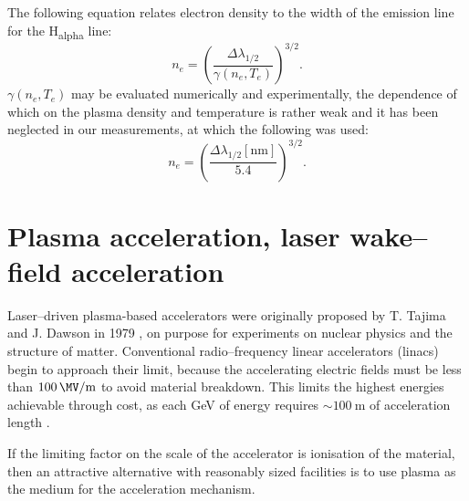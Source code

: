\documentclass[../main.tex]{subfiles}
\begin{document}
The following equation relates electron density to the width of the emission line for the H\textsubscript{alpha} line:
\begin{equation}
n_e=\left( \frac{\Delta\lambda_{1/2}}{\gamma\left(n_e,T_e\right)}\right)^{3/2}.
\end{equation}
$\gamma\left(n_e,T_e\right)$ may be evaluated numerically and experimentally\cite{Griem2005ComparisonResults}, the dependence of which on the plasma density and temperature is rather weak and it has been neglected in our measurements, at which the following was used:
\begin{equation}
n_e=\left( \frac{\Delta\lambda_{1/2}\left[\si{\nm}\right]}{5.4}\right)^{3/2}. \label{eq:delta_lambda}
\end{equation}


\section{Plasma acceleration, laser wake--field acceleration}\label{sec:wakefield}
Laser--driven plasma-based accelerators were originally proposed by T. Tajima and J. Dawson in 1979 \cite{Dawson1979}, on purpose for experiments on nuclear physics and the structure of matter. Conventional radio--frequency linear accelerators (linacs) begin to approach their limit, because the accelerating electric fields  must  be  less  than  $\SI{100}{\MV\per \m}$  to  avoid material breakdown. This limits the highest energies achievable through cost, as each \si{\GeV} of energy requires $\sim \SI{100}{\m}$ of acceleration length \cite{Esarey2009PhysicsAccelerators}.

If the limiting factor on the scale of the accelerator is ionisation of the material, then an attractive alternative with reasonably sized facilities is to use plasma as the medium for the acceleration mechanism.
\end{document}
